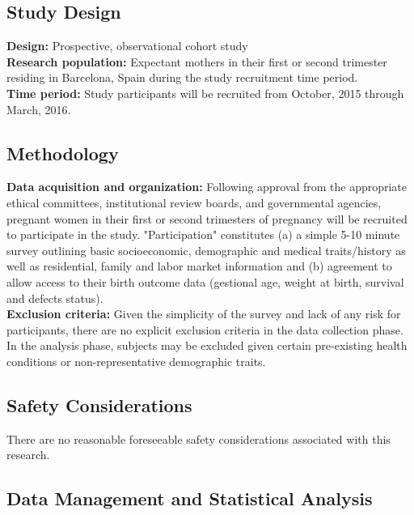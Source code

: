\documentclass{article}
\begin{document}
\begin{multicols}{2}
\subsection*{Study Design}
\noindent \textbf{Design:} Prospective, observational cohort study \\

\noindent \textbf{Research population:} Expectant mothers in their first or second trimester residing in Barcelona, Spain during the study recruitment time period. \\

\noindent \textbf{Time period:} Study participants will be recruited from October, 2015 through March, 2016.  


\subsection*{Methodology}

\noindent \textbf{Data acquisition and organization:} Following approval from the appropriate ethical committees, institutional review boards, and governmental agencies, pregnant women in their first or second trimesters of pregnancy will be recruited to participate in the study.  "Participation" constitutes (a) a simple 5-10 minute survey outlining basic socioeconomic, demographic and medical traits/history as well as residential, family and labor market information and (b) agreement to allow access to their birth outcome data (gestional age, weight at birth, survival and defects status). \\

\noindent \textbf{Exclusion criteria:} Given the simplicity of the survey and lack of any risk for participants, there are no explicit exclusion criteria in the data collection phase.  In the analysis phase, subjects may be excluded given certain pre-existing health conditions or non-representative demographic traits.   \\

\subsection*{Safety Considerations}

There are no reasonable foreseeable safety considerations associated with this research.  


\subsection*{Data Management and Statistical Analysis}


\end{multicols}
\end{document}
